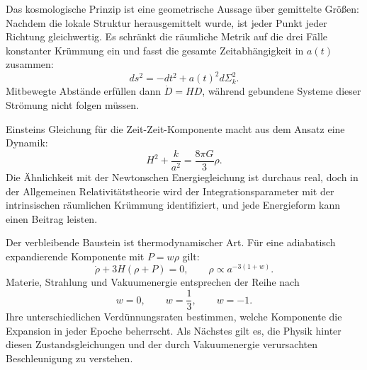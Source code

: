 Das kosmologische Prinzip ist eine geometrische Aussage über gemittelte Größen: Nachdem die lokale Struktur herausgemittelt wurde, ist jeder Punkt jeder Richtung gleichwertig. Es schränkt die räumliche Metrik auf die drei Fälle konstanter Krümmung ein und fasst die gesamte Zeitabhängigkeit in \(a(t)\) zusammen:
\begin{equation}
ds^2=-dt^2+a(t)^2d\Sigma_k^2.
\end{equation}
Mitbewegte Abstände erfüllen dann \(\dot D=HD\), während gebundene Systeme dieser Strömung nicht folgen müssen.

Einsteins Gleichung für die Zeit-Zeit-Komponente macht aus dem Ansatz eine Dynamik:
\begin{equation}
H^2+\frac{k}{a^2}=\frac{8\pi G}{3}\rho.
\end{equation}
Die Ähnlichkeit mit der Newtonschen Energiegleichung ist durchaus real, doch in der Allgemeinen Relativitätstheorie wird der Integrationsparameter mit der intrinsischen räumlichen Krümmung identifiziert, und jede Energieform kann einen Beitrag leisten.

Der verbleibende Baustein ist thermodynamischer Art. Für eine adiabatisch expandierende Komponente mit \(P=w\rho\) gilt:
\begin{equation}
\dot\rho+3H(\rho+P)=0,
\qquad
\rho\propto a^{-3(1+w)}.
\end{equation}
Materie, Strahlung und Vakuumenergie entsprechen der Reihe nach
\begin{equation}
w=0,\qquad w=\frac13,\qquad w=-1.
\end{equation}
Ihre unterschiedlichen Verdünnungsraten bestimmen, welche Komponente die Expansion in jeder Epoche beherrscht. Als Nächstes gilt es, die Physik hinter diesen Zustandsgleichungen und der durch Vakuumenergie verursachten Beschleunigung zu verstehen.
